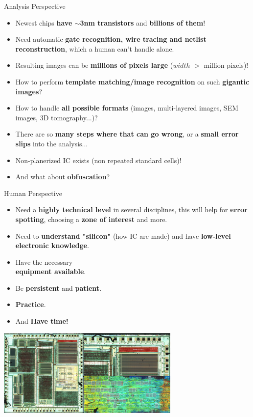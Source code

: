 \documentclass[aspectratio=169]{beamer}
\begin{document}
	\begin{frame}{Analysis Perspective}
		\begin{itemize}
			\item Newest chips \textbf{have $\sim$3nm transistors} and \textbf{billions of them}!
			\item Need automatic \textbf{gate recognition, wire tracing and netlist reconstruction}, which a human can't handle alone.
			\item Resulting images can be \textbf{millions of pixels large} ($width$ $>$ million pixels)!
			\item How to perform \textbf{template matching/image recognition} on such \textbf{gigantic images}?
			\item How to handle \textbf{all possible formats} (images, multi-layered images, SEM images, 3D tomography...)?
			\item There are so \textbf{many steps where that can go wrong}, or a \textbf{small error slips} into the analysis...
			\item Non-planerized IC exists (non repeated standard cells)! 
			\item And what about \textbf{obfuscation}? 
		\end{itemize}
	\end{frame}
	
	\begin{frame}{Human Perspective}		
		\begin{itemize}
			\item Need a \textbf{highly technical level} in several disciplines, this will help for \textbf{error spotting}, choosing a \textbf{zone of interest} and more.
			\item Need to \textbf{understand "silicon"} (how IC are made) and have \textbf{low-level electronic knowledge}.
			\item Have the necessary \\ \textbf{equipment available}.
			\item Be \textbf{persistent} and \textbf{patient}.
			\item \textbf{Practice}.
			\item And \textbf{Have time!}
		\end{itemize}
		
		\vspace{-30mm}
		\hfill\parbox{.65\textwidth}{
			\includegraphics[width=9cm]{res/dect.png}
		}
	\end{frame}
	
\end{document}
